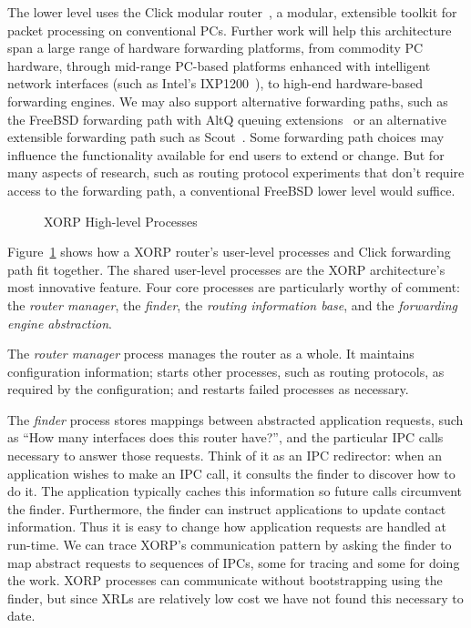 The lower level uses the Click modular router~\cite{click}, a
modular, extensible toolkit for packet processing on conventional PCs.
Further work will help this architecture span a
large range of hardware forwarding platforms, from commodity
PC hardware, through mid-range PC-based platforms
enhanced with intelligent network interfaces (such as Intel's
IXP1200~\cite{ixp1200,scoutixp}), to high-end hardware-based forwarding engines.
We may also support alternative forwarding paths, such as the
FreeBSD forwarding path with AltQ queuing extensions~\cite{altq}
or an alternative extensible forwarding path such as
Scout~\cite{pathrouter}.
Some forwarding path choices may influence the functionality available
for end users to extend or change.  But for many aspects of research, such
as routing protocol experiments that don't
require access to the forwarding path, a conventional FreeBSD
lower level would suffice.

\begin{figure}[h]
\centerline{}
\caption{XORP High-level Processes}
\label{fig:processes}
\vspace{-0.1in}
\end{figure}

Figure~\ref{fig:processes} shows how a XORP router's user-level processes
and Click forwarding path fit together.
The shared user-level processes are the XORP architecture's most innovative
feature. Four core processes are particularly worthy of comment: the
\emph{router manager},
the \emph{finder}, the \emph{routing information base}, and the 
\emph{forwarding engine abstraction}.  

The \emph{router manager}
process manages the router as a whole.  It maintains
configuration information; starts other processes, such as routing
protocols, as required by the configuration; and restarts failed
processes as necessary.

The \emph{finder} process stores mappings between abstracted application
requests, such as ``How many interfaces does this router have?'', and the
particular IPC calls necessary to answer those requests.
Think of it as an IPC redirector:
when an application wishes to make an IPC
call, it consults the finder to discover how to do it.  The
application typically caches this information so future calls
circumvent the finder.  Furthermore, the finder can instruct
applications to update contact information.  Thus it is easy to change
how application requests are handled at run-time.  We
can trace XORP's communication pattern by asking the finder to map
abstract requests to sequences of IPCs, some for tracing and some for
doing the work.  XORP processes can communicate without
bootstrapping using the finder, but since XRLs are relatively low cost we
have not found this necessary to date.

